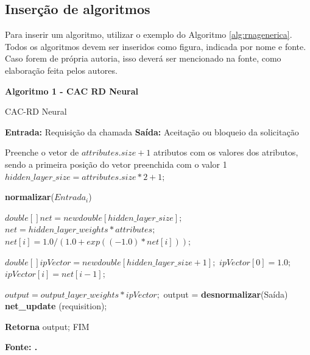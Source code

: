 \subsection{\esp Inserção de algoritmos}

Para inserir um algoritmo, utilizar o exemplo do Algoritmo  \ref{alg:rnagenerica}.
Todos os algoritmos devem ser inseridos como figura, indicada por nome e  fonte. Caso
forem de própria autoria, isso deverá ser mencionado na fonte, como elaboração feita pelos autores.

\begin{center}
	\textbf{Algoritmo 1 -  CAC RD Neural}
	\vspace{-0.3cm}
	\begin{minipage}[ht]{13cm}
		\begin{algorithm}[H]
			\footnotesize
			\caption{CAC-RD Neural}
			\label{alg:rnagenerica}
			\begin{algorithmic}[1]
				\STATE \textbf{Entrada:} Requisição da chamada
				\STATE \textbf{Saída:} Aceitação ou bloqueio da solicitação

				\STATE Preenche o vetor de $attributes.size+1$ atributos com os valores dos atributos, sendo a primeira posição do vetor preenchida com o valor 1
				\STATE $hidden\_layer\_size =  attributes.size*2+1;$

				\STATE \textbf{normalizar}($Entrada_i$)
				\ENDFOR

				\STATE $double [] net = new double [hidden\_layer\_size];$
				\STATE $net = hidden\_layer\_weights * attributes;$
				\STATE $net [i] = 1.0 / (1.0 + exp((-1.0)*net[i]));$
				\ENDFOR

				\STATE $double [] ipVector = new double [hidden\_layer\_size+1];$
				\STATE $ipVector [0] = 1.0;$
				\STATE $ipVector [i] = net [i-1];$
				\ENDFOR

				\STATE $output = output\_layer\_weights *  ipVector;$
				\STATE output = \textbf{desnormalizar}(Saída)
				\STATE \textbf{net\_update} (requisition);

				\STATE \textbf{Retorna} output; FIM
			\end{algorithmic}
		\end{algorithm}

		\small \centering \textbf{\footnotesize Fonte: \cite{mestrado}.}
	\end{minipage}
\end{center}

